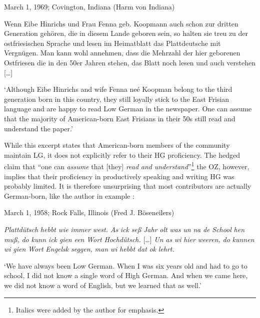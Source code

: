 \documentclass[output=paper]{langsci/langscibook}
\begin{document}
\ea
\label{ex:rocker:1}
March 1, 1969; Covington, Indiana (Harm von Indiana)\smallskip\\\relax

Wenn Eibe Hinrichs und Frau Fenna geb. Koopmann auch schon zur dritten Generation gehören, die in diesem Lande geboren sein, so halten sie treu zu der ostfriesischen Sprache und lesen im Heimatblatt das Plattdeutsche mit Vergnügen. Man kann wohl annehmen, dass die Mehrzahl der hier geborenen Ostfriesen die in den 50er Jahren stehen, das Blatt noch lesen und auch verstehen […]\smallskip\\\relax 

‘Although Eibe Hinrichs and wife Fenna neé Koopman belong to the third generation born in this country, they still loyally stick to the East Frisian language and are happy to read Low German in the newspaper. One can assume that the majority of American-born East Frisians in their 50s still read and understand the paper.’
\z

\begin{sloppypar}
While this excerpt states that American-born members of the community maintain LG, it does not explicitly refer to their HG proficiency. The hedged claim that “one can \textit{assume} that [they] \textit{read} \textit{and} \textit{understand}”\footnote{Italics were added by the author for emphasis.} the OZ, however, implies that their proficiency in productively speaking and writing HG was probably limited. It is therefore unsurprising that most contributors are actually German-born, like the author in example : 
\end{sloppypar}


\ea
\label{ex:rocker:2}
March 1, 1958; Rock Falls, Illinois (Fred J. Böseneilers)\smallskip\\\relax 

\textit{Plattdütsch} \textit{hebbt} \textit{wie} \textit{immer} \textit{west.} \textit{As} \textit{ick} \textit{seß} \textit{Jahr} \textit{olt} \textit{was} \textit{un} \textit{na} \textit{de} \textit{School} \textit{hen} \textit{muß,} \textit{do} \textit{kunn} \textit{ick} \textit{gien} \textit{een} \textit{Wort} \textit{Hochdütsch.} […] \textit{Un} \textit{as} \textit{wi} \textit{hier} \textit{weeren,} \textit{do} \textit{kunnen} \textit{wi} \textit{gien} \textit{Wort} \textit{Engelsk} \textit{seggen,} \textit{man} \textit{wi} \textit{hebbt} \textit{dat} \textit{ok} \textit{lehrt.} \smallskip\\\relax 

‘We have always been Low German. When I was six years old and had to go to school, I did not know a single word of High German. And when we came here, we did not know a word of English, but we learned that as well.’
\z
\end{document}

